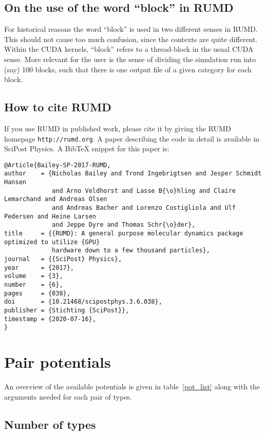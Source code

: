 \documentclass[a4paper]{article}
\begin{document}
\subsection{On the use of the word ``block'' in RUMD}

For historical reasons the word ``block'' is used in two different senses in 
RUMD. This should not cause too much confusion, since the contexts are quite
different. Within the CUDA kernels, ``block'' refers to a thread-block in the
usual CUDA sense. More relevant for the user is the sense of dividing the 
simulation run into (say) 100 blocks, such that there is one output file of a
given category for each block.

\subsection{How to cite RUMD}

If you use RUMD in published work, please cite it by giving the RUMD homepage \verb|http://rumd.org|.
A paper describing the code in detail is available in SciPost Physics.  A BibTeX snippet for this paper is:

\begin{verbatim}
@Article{Bailey-SP-2017-RUMD,
author    = {Nicholas Bailey and Trond Ingebrigtsen and Jesper Schmidt Hansen 
             and Arno Veldhorst and Lasse B{\o}hling and Claire Lemarchand and Andreas Olsen 
             and Andreas Bacher and Lorenzo Costigliola and Ulf Pedersen and Heine Larsen 
             and Jeppe Dyre and Thomas Schr{\o}der},
title     = {{RUMD}: A general purpose molecular dynamics package optimized to utilize {GPU} 
             hardware down to a few thousand particles},
journal   = {{SciPost} Physics},
year      = {2017},
volume    = {3},
number    = {6},
pages     = {038},
doi       = {10.21468/scipostphys.3.6.038},
publisher = {Stichting {SciPost}},
timestamp = {2020-07-16},
}
\end{verbatim}

\section{Pair potentials}


An overview of the available 
potentials is given in table~\ref{pot_list} along with the
arguments needed for each pair of types.




\subsection{Number of types}
\end{document}

